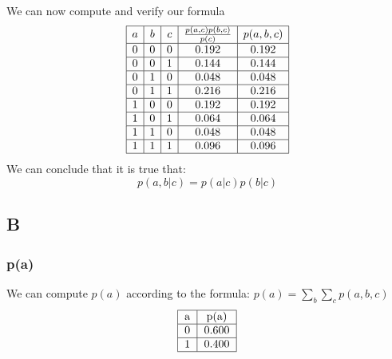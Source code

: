 \documentclass{article}
\begin{document}
                We can now compute and verify our formula
                \[
                    \begin{array}{|c|c|c|c|c|}
                        \hline
                        a&b&c&\frac{p(a, c)p(b, c)}{p(c)}&p(a, b, c)\\
                        \hline
                        0 & 0 & 0 & 0.192 & 0.192 \\
                        \hline
                        0 & 0 & 1 & 0.144 & 0.144 \\
                        \hline
                        0 & 1 & 0 & 0.048 & 0.048 \\
                        \hline
                        0 & 1 & 1 & 0.216 & 0.216 \\
                        \hline
                        1 & 0 & 0 & 0.192 & 0.192 \\
                        \hline
                        1 & 0 & 1 & 0.064 & 0.064 \\
                        \hline
                        1 & 1 & 0 & 0.048 & 0.048 \\
                        \hline
                        1 & 1 & 1 & 0.096 & 0.096 \\
                        \hline
                    \end{array}
                \]
                We can conclude that it is true that:
                \[
                    p(a,b|c)=p(a|c)p(b|c)
                \]
        \subsection{B}
            \subsubsection{p(a)}
                We can compute $p(a)$ according to the formula: $p(a)=\sum_b\sum_cp(a, b, c)$
                \[
                    \begin{tabular}{|c|c|}
                        \hline
                        a&p(a)\\
                        \hline
                        0&0.600\\
                        \hline
                        1&0.400\\
                        \hline
                    \end{tabular}
                \]
\end{document}
